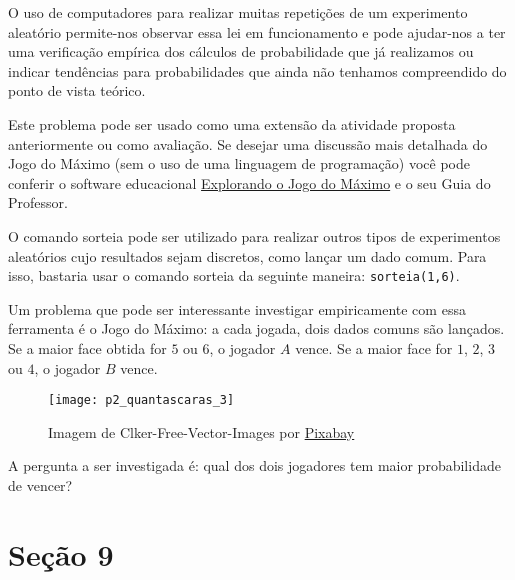 O uso de computadores para realizar muitas repetições de um experimento aleatório permite-nos observar essa lei em funcionamento e pode ajudar-nos a ter uma verificação empírica dos cálculos de probabilidade que já realizamos ou indicar tendências para probabilidades que ainda não tenhamos compreendido do ponto de vista teórico.

\label{comp-know5}

\begin{texto}
{
Este problema pode ser usado como uma extensão da atividade proposta anteriormente ou como avaliação. Se desejar uma discussão mais detalhada do Jogo do Máximo (sem o uso de uma linguagem de programação) você pode conferir o software educacional \href{https://m3.ime.unicamp.br/recursos/1237}{Explorando o Jogo do Máximo} e o seu Guia do Professor.	
}
\end{texto}

O comando sorteia pode ser utilizado para realizar outros tipos de experimentos aleatórios cujo resultados sejam discretos, como lançar um dado comum. Para isso, bastaria usar o comando sorteia da seguinte maneira: \verb|sorteia(1,6)|.

Um problema que pode ser interessante investigar empiricamente com essa ferramenta é o Jogo do Máximo: a cada jogada, dois dados comuns são lançados. Se a maior face obtida for $5$ ou $6$, o jogador $A$ vence. Se a maior face for $1$, $2$, $3$ ou $4$, o jogador $B$ vence.

\begin{figure}[H]
\centering

\texttt{[image: p2\_quantascaras\_3]}
\caption{Imagem de Clker-Free-Vector-Images por \href{https://pixabay.com/pt/?utm_source=link-attribution\&utm_medium=referral\&utm_campaign=image\&utm_content=25637}{Pixabay}}

\end{figure}

A pergunta a ser investigada é: qual dos dois jogadores tem maior probabilidade de vencer?


\section{Seção 9}

